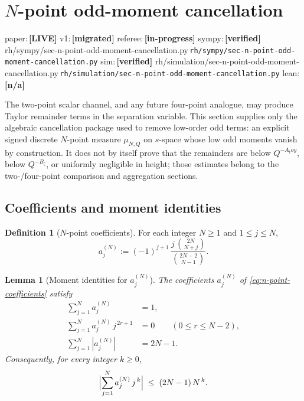 \documentclass[11pt,a4paper]{amsart}
\def\toy{toy}%
\numberwithin{equation}{section}
\theoremstyle{plain}
\newtheorem{lemma}[theorem]{Lemma}
\theoremstyle{definition}
\newtheorem{definition}[theorem]{Definition}
\newcommand{\z}{\zeta}
\newcommand{\toy}{\mathrm{toy}}
\newcommand{\status}[1]{\textbf{\scriptsize[#1]}}
\newcommand{\statuspaper}[1]{\textsf{\footnotesize paper:}\,\status{#1}}
\newcommand{\statusmig}[1]{\textsf{\footnotesize v1:}\,\status{#1}}
\newcommand{\statusreferee}[1]{\textsf{\footnotesize referee:}\,\status{#1}}
\newcommand{\statussympy}[2][\relax]{%
  \textsf{\footnotesize sympy:}\,\status{#2}%
  \ifx\relax#1\else\,\textsf{\scriptsize\texttt{#1}}\fi%
}
\newcommand{\statussim}[2][\relax]{%
  \textsf{\footnotesize sim:}\,\status{#2}%
  \ifx\relax#1\else\,\textsf{\scriptsize\texttt{#1}}\fi%
}
\newcommand{\statuslean}[2][\relax]{%
  \textsf{\footnotesize lean:}\,\status{#2}%
  \ifx\relax#1\else\,\textsf{\scriptsize\texttt{#1}}\fi%
}
\begin{document}
\section{\texorpdfstring{\(N\)}{N}-point odd-moment cancellation}
\label{sec:n-point-odd-moment-cancellation}
\statuspaper{LIVE}\quad
\statusmig{migrated}\quad
\statusreferee{in-progress}\quad
\statussympy[rh/sympy/sec-n-point-odd-moment-cancellation.py]{verified}\quad
\statussim[rh/simulation/sec-n-point-odd-moment-cancellation.py]{verified}\quad
\statuslean{n/a}
\par\medskip

The two-point scalar channel, and any future four-point analogue, may
produce Taylor remainder terms in the separation variable.  This section
supplies only the algebraic cancellation package used to remove low-order
odd terms: an explicit signed discrete \(N\)-point measure
\(\mu_{N,Q}\) on \(s\)-space whose low odd moments vanish by
construction.  It does not by itself prove that the remainders are below
\(Q^{-A_\toy}\), below \(Q^{-B_\z}\), or uniformly negligible in height;
those estimates belong to the two-/four-point comparison and aggregation
sections.

\subsection{Coefficients and moment identities}
\label{subsec:n-point-coefficients}

\begin{definition}[\(N\)-point coefficients]
\label{def:n-point-coefficients}
For each integer \(N\ge 1\) and \(1\le j\le N\),
\begin{equation}
\label{eq:n-point-coefficients}
        a_j^{(N)}
        :=
        (-1)^{j+1}\,
        \frac{j\,\binom{2N}{N+j}}{\binom{2N-2}{N-1}}.
\end{equation}
\end{definition}

\begin{lemma}[Moment identities for \(a_j^{(N)}\)]
\label{lem:n-point-coefficients}
The coefficients \(a_j^{(N)}\) of \eqref{eq:n-point-coefficients} satisfy
\begin{align}
\label{eq:n-point-normalization}
        \sum_{j=1}^N a_j^{(N)}
        &= 1,\\
\label{eq:n-point-odd-moments-vanish}
        \sum_{j=1}^N a_j^{(N)}\, j^{\,2r+1}
        &= 0
        \qquad (0\le r\le N-2),\\
\label{eq:n-point-ell1}
        \sum_{j=1}^N |a_j^{(N)}|
        &= 2N - 1.
\end{align}
Consequently, for every integer \(k\ge 0\),
\begin{equation}
\label{eq:n-point-moment-bound}
        \Bigl|\sum_{j=1}^N a_j^{(N)}\, j^{\,k}\Bigr|
        \;\le\;
        (2N-1)\,N^{\,k}.
\end{equation}
\end{lemma}
\end{document}
